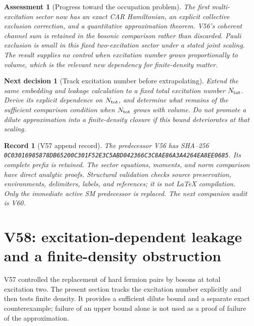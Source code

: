 \documentclass[11pt]{article}
\newtheorem{decision}[theorem]{Next decision}
\newtheorem{assessment}[theorem]{Assessment}
\newtheorem{record}[theorem]{Record}
\theoremstyle{remark}
\begin{document}
\begin{assessment}[Progress toward the occupation problem]
\label{ass:v20v57}
The first multi-excitation sector now has an exact CAR
Hamiltonian, an explicit collective exclusion correction,
and a quantitative approximation theorem.  V56's coherent
channel sum is retained in the bosonic comparison rather
than discarded.  Pauli exclusion is small in this fixed
two-excitation sector under a stated joint scaling.
The result supplies no control when excitation number
grows proportionally to volume, which is the relevant
new dependency for finite-density matter.
\end{assessment}

\begin{decision}[Track excitation number before extrapolating]
\label{dec:v20v57-next}
Extend the same embedding and leakage calculation to a
fixed total excitation number \(N_{\rm tot}\).
Derive its explicit dependence on \(N_{\rm tot}\), and
determine what remains of the sufficient comparison
condition when \(N_{\rm tot}\) grows with volume.
Do not promote a dilute approximation into a finite-density
closure if this bound deteriorates at that scaling.
\end{decision}

\begin{record}[V57 append record]
\label{rec:v20v57}
The predecessor V56 has SHA--256
\texttt{0C03016985878DB65200C301F52E3C5ABD042366C3C8AE86A3A4264EA8EE0685}.
Its complete prefix is retained.  The sector equations,
moments, and norm comparison have direct analytic proofs.
Structural validation checks source preservation,
environments, delimiters, labels, and references; it is
not LaTeX compilation.  Only the immediate active SM
predecessor is replaced.  The next companion audit is V60.
\end{record}


\section{V58: excitation-dependent leakage and a finite-density obstruction}
\label{sec:v20v58}

V57 controlled the replacement of hard fermion pairs by bosons
at total excitation two.  The present section tracks the excitation
number explicitly and then tests finite density.  It provides a
sufficient dilute bound and a separate exact counterexample;
failure of an upper bound alone is not used as a proof of failure
of the approximation.
\end{document}
